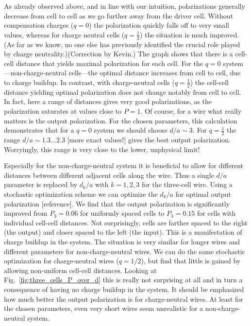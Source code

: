 As already observed above, and in line with our intuition, polarizations
generally decrease from cell to cell as we go further away from the driver cell.
Without compensation charges ($q=0$) the polarization quickly falls off to very
small values, whereas for charge neutral cells ($q = \frac{1}{2}$) the situation
is much improved. (As far as we know, no one else has previously identified the
crucial role played by charge neutrality.)(Correction by Kevin.) The graph shows
that there is a cell-cell distance that yields maximal polarization for each
cell. For the $q=0$ system---non-charge-neutral cells---the optimal distance
increases from cell to cell, due to charge buildup. In contrast, with
charge-neutral cells ($q=\frac{1}{2}$) the cell-cell distance yielding optimal
polarization does not change notably from cell to cell. In fact, here a range of
distances gives very good polarizations, as the polarization saturates at values
close to $P = 1$. Of course, for a wire what really matters is the output
polarization. For the chosen parameters, this calculation demonstrates that for
a $q=0$ system we should choose $d/a \sim 3$. For $q=\frac{1}{2}$ the range $d/a
\sim 1.3 \ldots 2.3$ {[}more exact values!{]} gives the best output
polarization. Worryingly, this range is very close to the lower, unphysical
limit!

Especially for the non-charge-neutral system it is beneficial to allow for
different distances between different adjacent cells along the wire.  Thus a
single $d/a$ parameter is replaced by $d_k/a$ with $k = 1,2,3$ for the
three-cell wire. Using a stochastic optimization scheme we can optimize the
$d_k/a$ for optimal output polarization {[}reference{]}. We find that the output
polarization is significantly improved from $P_3 = 0.06$ for uniformly spaced
cells to $P_3 = 0.15$ for cells with individual cell-cell distances. Not
surprisingly, cells are farther spaced to the right (the output) and closer
spaced to the left (the input). This is a manifestation of charge buildup in the
system. The situation is very similar for longer wires and different parameters
for non-charge-neutral wires. We can do the same stochastic optimization for
charge-neutral wires ($q=1/2$), but find that little is gained by allowing
non-uniform cell-cell distances. Looking at Fig.~\ref{fig:three_cells_P_over_d}
this is really not surprising at all and in turn a consequence of having no
charge buildup in the system. It should be emphasized how much better the output
polarization is for charge-neutral wires. At least for the chosen parameters,
even very short wires seem unrealistic for a non-charge-neutral system.

